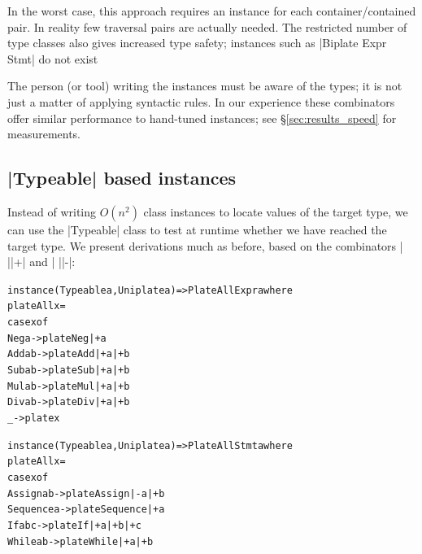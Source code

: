 \documentclass[preprint]{sigplanconf}
\newenvironment{code}{\begin{alltt}\small}{\end{alltt}}
\newcommand{\ignore}{}
\begin{document}
In the worst case, this approach requires an instance for each container/contained pair. In reality few traversal pairs are actually needed. The restricted number of type classes also gives increased type safety; instances such as \ignore|Biplate Expr Stmt| do not exist

The person (or tool) writing the instances must be aware of the types; it is not just a matter of applying syntactic rules. In our experience these combinators offer similar performance to hand-tuned instances; see \S\ref{sec:results_speed} for measurements.


\subsection{|Typeable| based instances}
\label{sec:implement_playtypeable}

Instead of writing $O(n^2)$ class instances to locate values of the target type, we can use the |Typeable| class to test at runtime whether we have reached the target type. We present derivations much as before, based on the combinators | ||+| and | ||-|:

\begin{code}
instance (Typeable a, Uniplate a) => PlateAll Expr a where
    plateAll x =
        case x of
            Neg a    ->  plate Neg  |+ a
            Add a b  ->  plate Add  |+ a |+ b
            Sub a b  ->  plate Sub  |+ a |+ b
            Mul a b  ->  plate Mul  |+ a |+ b
            Div a b  ->  plate Div  |+ a |+ b
            _        ->  plate x

instance (Typeable a, Uniplate a) => PlateAll Stmt a where
    plateAll x =
        case x of
            Assign    a b    -> plate Assign    |-  a |+ b
            Sequence  a      -> plate Sequence  |+  a
            If        a b c  -> plate If        |+  a |+ b |+ c
            While     a b    -> plate While     |+  a |+ b
\end{code}
\end{document}
